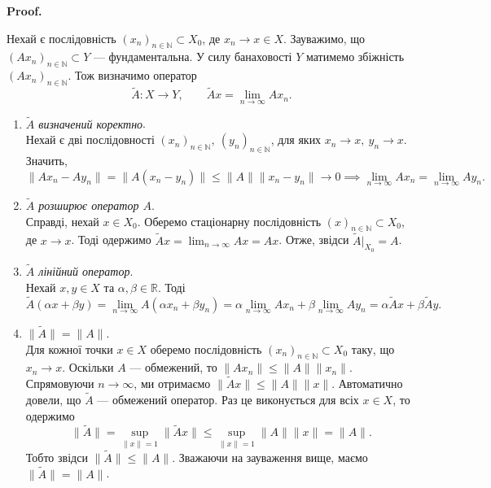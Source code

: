 \documentclass[a4paper, 10pt]{article}
\makeatletter
\theoremstyle{theoremdd}
\theoremstyle{theoremdd}
\theoremstyle{theoremdd}
\theoremstyle{theoremdd}
\theoremstyle{theoremdd}
\theoremstyle{theoremdd}
\theoremstyle{theoremdd}
\theoremstyle{theoremdd}
\newcommand{\sequence}[2][]{\left({#2}\right)_{n=\ifthenelse{\isempty{#1}}{1}{#1}}^{\infty}}
\renewenvironment{proof}[1][Proof.\\]{\par
\pushQED{\hfill \qed}%
\normalfont \topsep6\p@\@plus6\p@\relax
\trivlist
\item\relax
{\bfseries
#1\@addpunct{.}}\hspace\labelsep\ignorespaces
}{%
\popQED\endtrivlist\@endpefalse
}
\makeatother
\begin{document}
\begin{proof}
Нехай є послідовність $(x_n)_{n \in \mathbb{N}} \subset X_0$, де $x_n \to x \in X$. Зауважимо, що $(Ax_n)_{n \in \mathbb{N}} \subset Y$ --- фундаментальна. У силу банаховості $Y$ матимемо збіжність $(Ax_n)_{n \in \mathbb{N}}$. Тож визначимо оператор 
\[
\tilde{A} \colon X \to Y, \qquad \tilde{A}x = \displaystyle\lim_{n \to \infty} Ax_n.
\]
\begin{enumerate}[wide=0pt,label={\Roman*.}]
\item \textit{$\tilde{A}$ визначений коректно}.\\
Нехай є дві послідовності $(x_n)_{n \in \mathbb{N}},\ (y_n)_{n \in \mathbb{N}}$, для яких $x_n \to x,\ y_n \to x$. Значить,
\[
\|Ax_n - Ay_n\| = \|A(x_n-y_n)\| \leq \|A\| \|x_n-y_n\| \to 0 \implies \displaystyle\lim_{n \to \infty} Ax_n = \lim_{n \to \infty} Ay_n.
\]
\item \textit{$\tilde{A}$ розширює оператор $A$}.\\
Справді, нехай $x \in X_0$. Оберемо стаціонарну послідовність $(x)_{n \in \mathbb{N}} \subset X_0$, де $x \to x$. Тоді одержимо $\tilde{A}x = \displaystyle\lim_{n \to \infty} Ax = Ax$. Отже, звідси $\tilde{A}|_{X_0} = A$.

\item \textit{$\tilde{A}$ лінійний оператор}.\\
Нехай $x,y \in X$ та $\alpha,\beta \in \mathbb{R}$. Тоді
\[
\tilde{A}(\alpha x + \beta y) = \displaystyle\lim_{n \to \infty} A(\alpha x_n + \beta y_n) = \alpha \lim_{n \to \infty} Ax_n + \beta \lim_{n \to \infty} Ay_n = \alpha \tilde{A}x + \beta \tilde{A}y.
\]

\item $\|\tilde{A}\| = \|A\|$.\\
Для кожної точки $x \in X$ оберемо послідовність $(x_n)_{n \in \mathbb{N}} \subset X_0$ таку, що $x_n \to x$. Оскільки $A$ --- обмежений, то $\|Ax_n\| \leq \|A\| \|x_n\|$. Спрямовуючи $n \to \infty$, ми отримаємо $\|\tilde{A}x\| \le \|A\| \|x\|$. Автоматично довели, що $\tilde{A}$ --- обмежений оператор. Раз це виконується для всіх $x \in X$, то одержимо 
\[
\|\tilde{A}\|= \displaystyle\sup_{\|x\| = 1} \|\tilde{A}x\| \leq \sup_{\|x\| = 1} \|A\| \|x\| = \|A\|.
\]
Тобто звідси $\|\tilde{A}\| \leq \|A\|$. Зважаючи на зауваження вище, маємо $\|\tilde{A}\| = \|A\|$.


\end{enumerate}
\end{proof}
\end{document}
